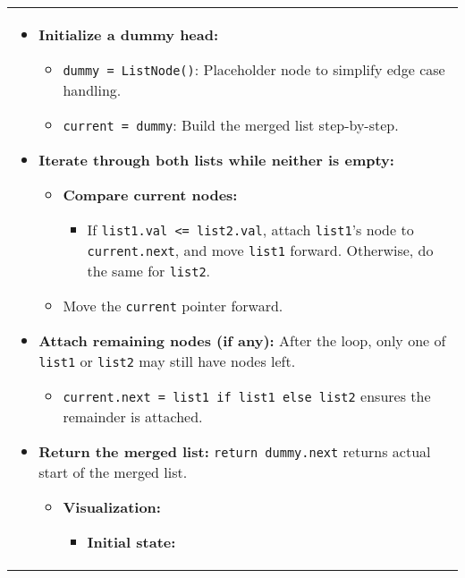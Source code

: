 \begin{summary}
\begin{center}
\begin{tabular}{ll}
                \multicolumn{2}{p{\linewidth}}{
                    \begin{itemize}
                        \item \textbf{Initialize a dummy head:} 
                        \begin{itemize}
                            \item \texttt{dummy = ListNode()}: Placeholder node to simplify edge case handling. 
                            \item \texttt{current = dummy}: Build the merged list step-by-step.
                        \end{itemize}
                    
                        \item \textbf{Iterate through both lists while neither is empty:} 
                        \begin{itemize}
                            \item \textbf{Compare current nodes:}
                            \begin{itemize}
                                \item If \texttt{list1.val <= list2.val}, attach \texttt{list1}'s node to \texttt{current.next}, and move \texttt{list1} forward. Otherwise, do the same for \texttt{list2}.
                            \end{itemize}
                            \item Move the \texttt{current} pointer forward.
                        \end{itemize}
                    
                        \item \textbf{Attach remaining nodes (if any):} After the loop, only one of \texttt{list1} or \texttt{list2} may still have nodes left. 
                        \begin{itemize}
                            \item \texttt{current.next = list1 if list1 else list2} ensures the remainder is attached.
                        \end{itemize}
                    
                        \item \textbf{Return the merged list:} \texttt{return dummy.next} returns actual start of the merged list.
                        \begin{itemize}
                        \item \textbf{Visualization:}
                        \begin{itemize}
                            \item \textbf{Initial state:}
                            

\end{itemize}
\end{itemize}
\end{itemize}}
\end{tabular}
\end{center}
\end{summary}
